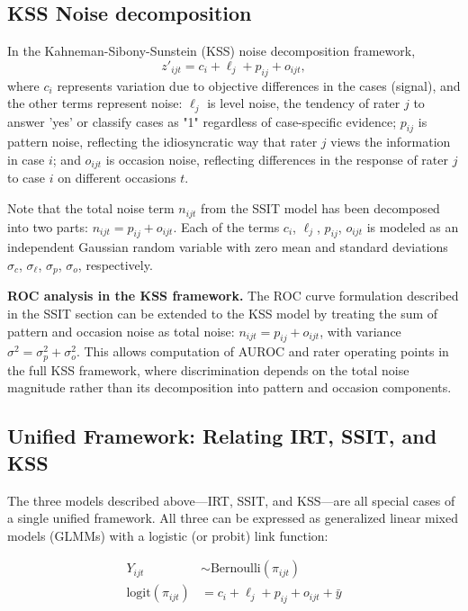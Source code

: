\documentclass[num-refs]{wiley-article}
\begin{document}
\subsection*{KSS Noise decomposition}\label{section-KSS}
In the Kahneman-Sibony-Sunstein (KSS) noise decomposition framework, $$z'_{ijt} = c_i + \ell_j + p_{ij} + o_{ijt},$$
where $c_i$ represents variation due to objective differences in the cases (signal), and the other terms represent noise: $\ell_j$ is level noise, the tendency of rater $j$ to answer 'yes' or classify cases as "1" regardless of case-specific evidence; $p_{ij}$ is pattern noise, reflecting the idiosyncratic way that rater $j$ views the information in case $i$; and $o_{ijt}$ is occasion noise, reflecting differences in the response of rater $j$ to case $i$ on different occasions $t$.

Note that the total noise term $n_{ijt}$ from the SSIT model has been decomposed into two parts: $n_{ijt} = p_{ij} + o_{ijt}$. Each of the terms $c_i$, $\ell_j$, $p_{ij}$, $o_{ijt}$ is modeled as an independent Gaussian random variable with zero mean and standard deviations $\sigma_c$, $\sigma_\ell$, $\sigma_p$, $\sigma_o$, respectively.

\textbf{ROC analysis in the KSS framework.} The ROC curve formulation described in the SSIT section can be extended to the KSS model by treating the sum of pattern and occasion noise as total noise: $n_{ijt} = p_{ij} + o_{ijt}$, with variance $\sigma^2 = \sigma_p^2 + \sigma_o^2$. This allows computation of AUROC and rater operating points in the full KSS framework, where discrimination depends on the total noise magnitude rather than its decomposition into pattern and occasion components.

\subsection*{Unified Framework: Relating IRT, SSIT, and KSS}\label{section-unified}

The three models described above---IRT, SSIT, and KSS---are all special cases of a single unified framework. All three can be expressed as generalized linear mixed models (GLMMs) with a logistic (or probit) link function:

\begin{equation}
\label{eq:master-model}
\boxed{
\begin{aligned}
Y_{ijt} &\sim \text{Bernoulli}(\pi_{ijt}) \\
\text{logit}(\pi_{ijt}) &= c_i + \ell_j + p_{ij} + o_{ijt} + \bar{y}
\end{aligned}
}
\end{equation}
\end{document}

